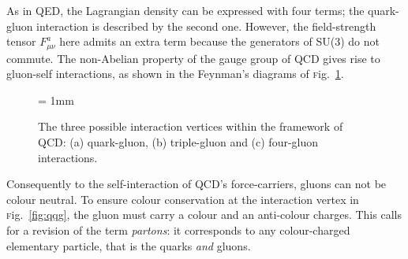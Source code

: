\documentclass[ALICE,manyauthors]{cernphprep}
\newcommand{\Fig}       {\textsc{f}ig.~}
\newcommand{\fig}       {\Fig}
\begin{document}
As in QED, the Lagrangian density can be expressed with four terms; the quark-gluon interaction is described by the second one. However, the field-strength tensor $F_{\mu \nu}^{a}$ here admits an extra term because the generators of SU(3) do not commute. The non-Abelian property of the gauge group of QCD gives rise to gluon-self interactions, as shown in the Feynman's diagrams of \fig\ref{fig:FeynmanDiagQCD}.

\begin{figure}[H]
\begin{center}
\unitlength = 1mm
\end{center}
\caption{The three possible interaction vertices within the framework of QCD: (a) quark-gluon, (b) triple-gluon and (c) four-gluon interactions.}
\label{fig:FeynmanDiagQCD}
\end{figure}

Consequently to the self-interaction of QCD's force-carriers, gluons can not be colour neutral. To ensure colour conservation at the interaction vertex in \fig\ref{fig:qqg}, the gluon must carry a colour and an anti-colour charges. This calls for a revision of the term \textit{partons}: it corresponds to any colour-charged elementary particle, that is the quarks \textit{and} gluons. 
\end{document}
